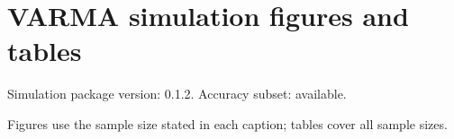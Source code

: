 \documentclass[10pt]{article}
\begin{document}
\section*{VARMA simulation figures and tables}
Simulation package version: 0.1.2. Accuracy subset: available. 
\par\medskip Figures use the sample size stated in each caption; tables cover all sample sizes.
\clearpage
\clearpage
\end{document}
